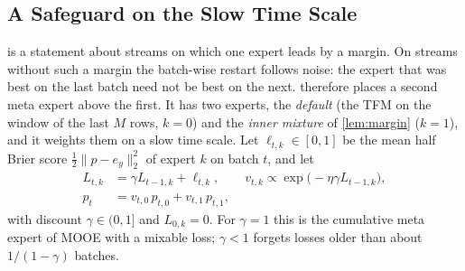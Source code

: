 
\subsection{A Safeguard on the Slow Time Scale}
\label{sec:outer}

 is a statement about streams on which one expert leads by a margin. On streams without such a
margin the batch-wise restart follows noise: the expert that was best on the last batch need not be best on the
next. \method{} therefore places a second meta expert above the first. It has two experts, the \emph{default}
(the TFM on the window of the last $M$ rows, $k=0$) and the \emph{inner mixture} of \cref{lem:margin} ($k=1$), and it
weights them on a slow time scale. Let $\ell_{t,k}\in[0,1]$ be the mean half Brier score
$\tfrac12\lVert p-e_y\rVert_2^2$ of expert $k$ on batch $t$, and let
\begin{equation}\label{eq:outer}
\begin{aligned}
  L_{t,k}&=\gamma L_{t-1,k}+\ell_{t,k},\qquad v_{t,k}\propto\exp\bigl(-\eta\gamma L_{t-1,k}\bigr),\\
  p_t&=v_{t,0}\,p_{t,0}+v_{t,1}\,p_{t,1},
\end{aligned}
\end{equation}
with discount $\gamma\in(0,1]$ and $L_{0,k}=0$. For $\gamma=1$ this is the cumulative meta expert of MOOE with a
mixable loss; $\gamma<1$ forgets losses older than about $1/(1-\gamma)$ batches.

